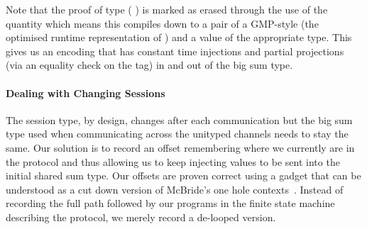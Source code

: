 \documentclass{easychair}
\begin{document}

Note that the proof of type
(   )
is marked as erased through the use of the 
quantity which means this compiles down to a pair of a
GMP-style  (the optimised runtime representation of )
and a value of the appropriate type.
%
This gives us an encoding that has constant time injections
and partial projections (via an equality check on the  tag)
in and out of the big sum type.

\paragraph{Dealing with Changing Sessions}
The session type, by design, changes after each communication
but the big sum type used when communicating across the
unityped channels needs to stay the same.
%
Our solution is to record an offset remembering where we currently
are in the protocol and thus allowing us to keep injecting values to
be sent into the initial shared sum type.
%
Our offsets are proven correct using a gadget that can be understood
as a cut down version of McBride's one hole
contexts~\cite{DBLP:conf/popl/McBride08}. Instead
of recording the full path followed by our programs in the finite
state machine describing the protocol,
we merely record a de-looped version.
\end{document}
